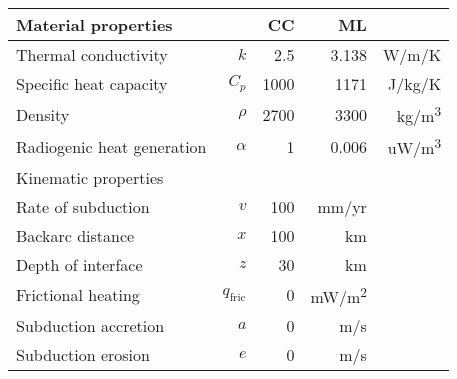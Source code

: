 \begin{tabular}{l r r r r}
\hline
  Material properties & & CC & ML & \\
\hline
  Thermal conductivity & $k$ & 2.5 & 3.138 & \si{W/m/K} \\
  Specific heat capacity & $C_p$ & 1000 & 1171 & \si{J/kg/K} \\
  Density & $\rho$ & 2700 & 3300 & \si{kg/m^3} \\
  Radiogenic heat generation & $\alpha$ & 1 & 0.006 & \si{uW/m^3} \\
\hline
  \multicolumn{5}{l}{Kinematic properties \citep[][subduction model]{Royden1993a}} \\
\hline
  Rate of subduction & $v$ & 100 & \si{mm/yr} \\
  Backarc distance & $x$ & 100 & \si{km} \\
  Depth of interface & $z$ & 30 & \si{km} \\
  Frictional heating & $q_\textrm{fric}$ & 0 & \si{mW/m^2} \\
  Subduction accretion & $a$ &  0 & \si{m/s} \\
  Subduction erosion & $e$ & 0 & \si{m/s} \\
\hline
\end{tabular}
